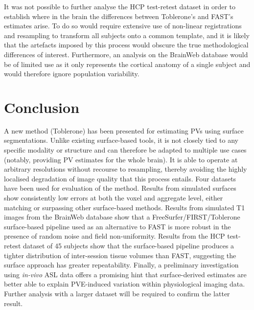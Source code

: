 It was not possible to further analyse the HCP test-retest dataset in order to establish where in the brain the differences between Toblerone’s and FAST’s estimates arise. To do so would require extensive use of non-linear registrations and resampling to transform all subjects onto a common template, and it is likely that the artefacts imposed by this process would obscure the true methodological differences of interest. Furthermore, an analysis on the BrainWeb database would be of limited use as it only represents the cortical anatomy of a single subject and would therefore ignore population variability.

\section{Conclusion}

A new method (Toblerone) has been presented for estimating PVs using surface segmentations. Unlike existing surface-based tools, it is not closely tied to any specific modality or structure and can therefore be adapted to multiple use cases (notably, providing PV estimates for the whole brain). It is able to operate at arbitrary resolutions without recourse to resampling, thereby avoiding the highly localised degradation of image quality that this process entails. Four datasets have been used for evaluation of the method. Results from simulated surfaces show consistently low errors at both the voxel and aggregate level, either matching or surpassing other surface-based methods. Results from simulated T1 images from the BrainWeb database show that a FreeSurfer/FIRST/Toblerone surface-based pipeline used as an alternative to FAST is more robust in the presence of random noise and field non-uniformity. Results from the HCP test-retest dataset of 45 subjects show that the surface-based pipeline produces a tighter distribution of inter-session tissue volumes than FAST, suggesting the surface approach has greater repeatability. Finally, a preliminary investigation using \textit{in-vivo} ASL data offers a promising hint that surface-derived estimates are better able to explain PVE-induced variation within physiological imaging data. Further analysis with a larger dataset will be required to confirm the latter result. 
